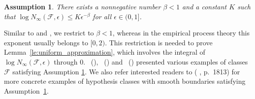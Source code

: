 \documentclass[letterpaper]{article} %
\newtheorem{assumption}{Assumption}
\newcommand{\complexbound}{\beta}
\newcommand{\red}[1]{\textcolor{red}{#1}}
\newcommand{\todo}[1]{\red{\textsc{todo:} #1}}
\newcommand{\citet}[1]{\citeauthor{#1}\ (\citeyear{#1})}
\begin{document}
\begin{assumption}\label{ass:covering_number} 
There exists a nonnegative number $\complexbound < 1$ and a constant $K$ such that $\log N_\infty(\mathcal{F},\epsilon) \le K\epsilon^{-\complexbound}$ for all $\epsilon\in (0,1]$. 
\end{assumption}

Similar to \cite{Massart2006} and \cite{rejchel2012ranking}, we restrict to $\complexbound{} < 1$, whereas in the empirical process theory this exponent usually belongs to $[0,2)$. This restriction is needed to prove Lemma~\ref{le:uniform_approximation}, which involves the integral of $\log N_\infty(\mathcal{F},\epsilon)$ through $0$. 
\citet{Dudley1974Metric}, \citet{Korostelev1993Minimax} and \citet{Mammen1995Asymptotical} presented various examples of classes $\mathcal{F}$ satisfying Assumption \ref{ass:covering_number}.
We also refer interested readers to (\citeauthor{Mammen1998Smooth} \citeyear{Mammen1998Smooth}, p.\ 1813) for more concrete examples of hypothesis classes with smooth boundaries satisfying Assumption~\ref{ass:covering_number}. 
\end{document}
